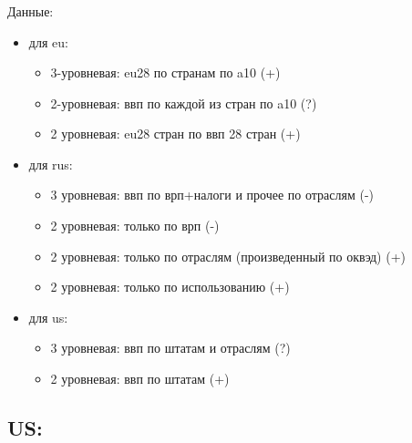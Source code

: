 \documentclass[c, dvipsnames]{beamer}  %
\begin{document}
\begin{frame}[shrink=5]
\frametitle{\insertsection} 
\framesubtitle{\insertsubsection}

Данные:

\begin{itemize}
	\item для  eu:
	
	\begin{itemize}
		\item 3-уровневая: eu28 по странам по a10 (+)
		\item 2-уровневая: ввп по каждой из стран по a10 (?)
		\item 2 уровневая: eu28 стран по ввп 28 стран (+)
	\end{itemize}
	
	\item для rus:
	
	\begin{itemize}
		\item 3 уровневая: ввп по врп+налоги и прочее по отраслям (-) 
		\item 2 уровневая: только по врп (-)
		\item 2 уровневая: только по отраслям (произведенный по оквэд) (+)
		\item 2 уровневая: только по использованию (+)
		
	\end{itemize}
	
	\item для us:
	
	\begin{itemize}
		\item 3 уровневая: ввп по штатам и отраслям (?)
		\item 2 уровневая: ввп по штатам (+)
	\end{itemize}
		
\end{itemize}

\end{frame}



\subsection{US:} 
\end{document}
